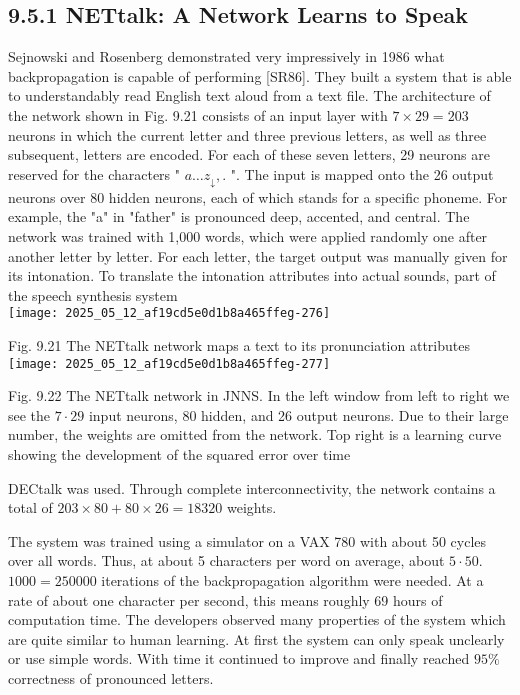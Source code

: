 \documentclass[10pt]{article}
\begin{document}
\subsection*{9.5.1 NETtalk: A Network Learns to Speak}
Sejnowski and Rosenberg demonstrated very impressively in 1986 what backpropagation is capable of performing [SR86]. They built a system that is able to understandably read English text aloud from a text file. The architecture of the network shown in Fig. 9.21 consists of an input layer with $7 \times 29=203$ neurons in which the current letter and three previous letters, as well as three subsequent, letters are encoded. For each of these seven letters, 29 neurons are reserved for the characters " $a \ldots z_{\downarrow},$. ". The input is mapped onto the 26 output neurons over 80 hidden neurons, each of which stands for a specific phoneme. For example, the "a" in "father" is pronounced deep, accented, and central. The network was trained with 1,000 words, which were applied randomly one after another letter by letter. For each letter, the target output was manually given for its intonation. To translate the intonation attributes into actual sounds, part of the speech synthesis system\\
\texttt{[image: 2025\_05\_12\_af19cd5e0d1b8a465ffeg-276]}

Fig. 9.21 The NETtalk network maps a text to its pronunciation attributes\\
\texttt{[image: 2025\_05\_12\_af19cd5e0d1b8a465ffeg-277]}

Fig. 9.22 The NETtalk network in JNNS. In the left window from left to right we see the $7 \cdot 29$ input neurons, 80 hidden, and 26 output neurons. Due to their large number, the weights are omitted from the network. Top right is a learning curve showing the development of the squared error over time

DECtalk was used. Through complete interconnectivity, the network contains a total of $203 \times 80+80 \times 26=18320$ weights.

The system was trained using a simulator on a VAX 780 with about 50 cycles over all words. Thus, at about 5 characters per word on average, about $5 \cdot 50$. $1000=250000$ iterations of the backpropagation algorithm were needed. At a rate of about one character per second, this means roughly 69 hours of computation time. The developers observed many properties of the system which are quite similar to human learning. At first the system can only speak unclearly or use simple words. With time it continued to improve and finally reached $95 \%$ correctness of pronounced letters.
\end{document}
